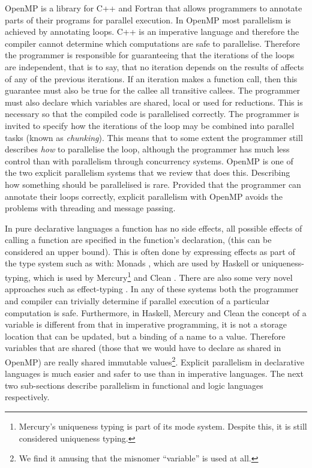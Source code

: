 OpenMP \citep{openmp} is a library for C++ \citep{cplusplus} and Fortran
that allows programmers to annotate parts of their programs for parallel
execution.
In OpenMP most parallelism is achieved by annotating loops.
C++ is an imperative language and therefore the compiler cannot determine
which computations are safe to parallelise.
Therefore the programmer is responsible for guaranteeing that the iterations
of the loops are independent,
that is to say, that no iteration depends on the results of affects of any of
the previous iterations.
If an iteration makes a function call, then this guarantee must also be true for
the callee all transitive callees.
The programmer must also declare which variables are shared, local or used
for reductions.
This is necessary so that the compiled code is parallelised correctly.
The programmer is invited to specify how the iterations of the loop may be
combined into parallel tasks (known as \emph{chunking}).
This means that to some extent the programmer still describes \emph{how} to
parallelise the loop,
although the programmer has much less control than with parallelism through
concurrency systems.
OpenMP is one of the two explicit parallelism systems that we review that
does this.
Describing how something should be parallelised is rare.
Provided that the programmer can annotate their loops correctly,
explicit parallelism with OpenMP avoids the problems
with threading and message passing.

In pure declarative languages
a function has no side effects,
all possible effects of calling a function are specified in the function's
declaration, (this can be considered an upper bound).
This is often done by expressing effects as part of the type system such as
with:
Monads \citep{haskell-monads}, which are used by Haskell \citep{haskell98}
or
uniqueness-typing, which is used by
Mercury\footnote{
    Mercury's uniqueness typing is part of its mode system.
    Despite this, it is still considered uniqueness typing.}
\citep{mercury_jlp}
and Clean \citep{brus:1987:clean}.
There are also some very novel approaches such as effect-typing \citep{ddc}.
In any of these systems both the programmer and compiler can trivially
determine if parallel execution of a particular computation is safe.
Furthermore,
in Haskell, Mercury and Clean
the concept of a variable is different from that in imperative programming,
it is not a storage location that can be updated,
but a binding of a name to a value.
Therefore variables that are shared
(those that we would have to declare as shared in OpenMP)
are really shared immutable values\footnote{
    We find it amusing that the misnomer ``variable'' is used at all.}.
Explicit parallelism in declarative languages is much easier and safer to use
than in imperative languages.
The next two sub-sections describe parallelism in functional and logic
languages respectively.

